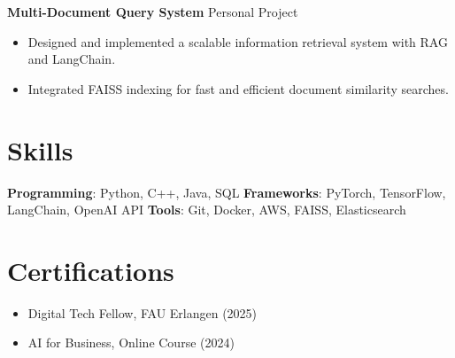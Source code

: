 \documentclass[a4paper,10pt]{article}
\begin{document}
\textbf{Multi-Document Query System} \hfill Personal Project
\begin{itemize}[leftmargin=*]
    \item Designed and implemented a scalable information retrieval system with RAG and LangChain.
    \item Integrated FAISS indexing for fast and efficient document similarity searches.
\end{itemize}

\section*{Skills}
\textbf{Programming}: Python, C++, Java, SQL \newline
\textbf{Frameworks}: PyTorch, TensorFlow, LangChain, OpenAI API \newline
\textbf{Tools}: Git, Docker, AWS, FAISS, Elasticsearch

\section*{Certifications}
\begin{itemize}[leftmargin=*]
    \item Digital Tech Fellow, FAU Erlangen (2025)
    \item AI for Business, Online Course (2024)
\end{itemize}
\end{document}
